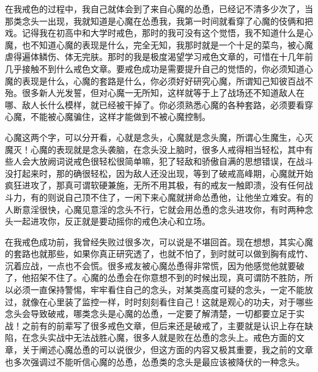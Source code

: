 在我戒色的过程中，我自己就体会到了来自心魔的怂恿，已经记不清多少次了，当那类念头一出现，我就知道是心魔在怂恿我，我第一时间就看穿了心魔的伎俩和把戏。记得我在初高中和大学时戒色，那时的我可没有这个觉悟，我不知道什么是心魔，也不知道心魔的表现是什么，完全无知，我那时就是一个十足的菜鸟，被心魔虐得遍体鳞伤、体无完肤。那时的我是极度渴望学习戒色文章的，可惜在十几年前几乎接触不到什么戒色文章。要戒色成功是需要提升自己的觉悟的，你必须知道心魔的表现是什么，心魔的套路是什么，你必须好好研究心魔，所谓知己知彼百战不殆。很多新人光发誓，但对心魔一无所知，这样就等于上了战场还不知道敌人在哪、敌人长什么模样，就已经被干掉了。你必须熟悉心魔的各种套路，必须要看穿心魔，不能被心魔骗住，这样才能做到不被心魔控制。

心魔这两个字，可以分开看，心就是念头，心魔就是念头魔，所谓心生魔生，心灭魔灭！心魔的表现就是念头袭脑，在念头没上脑时，很多人戒得相当轻松，其中有些人会大放阙词说戒色很轻松很简单嘛，犯了轻敌和骄傲自满的思想错误，在战斗没打起来时，那的确很轻松，因为敌人还没出现，等到了破戒高峰期，心魔就开始疯狂进攻了，那真可谓软硬兼施，无所不用其极，有的戒友一触即溃，没有任何战斗力，有的则说自己顶不住了，一闲下来心魔就拼命怂恿他，让他坐立难安。有的人断意淫很快，心魔见意淫的念头不行，它就会用怂恿的念头进攻你，有时两种念头一起进攻你，反正就是要动摇你的戒色决心和立场。

在我戒色成功前，我曾经失败过很多次，可以说是不堪回首。现在想想，其实心魔的套路也就那些，如果你真正研究透了，也就不怕了，到时就可以做到胸有成竹、沉着应战，一点也不会慌。很多戒友被心魔怂恿得非常慌，因为他感觉他就要破了，他招架不住了。心魔的怂恿会在你意想不到的时候出现，真可谓防不胜防，所以必须一直保持警惕，牢牢看住自己的念头，对某类高度可疑的念头，一定不能放过，就像在心里装了监控一样，时时刻刻看住自己！这就是观心的功夫，对于哪些念头会导致破戒，哪类念头是心魔的怂恿，一定要了解清楚，一切都要立足于实战！之前有的前辈写了很多戒色文章，但后来还是破戒了，主要就是认识上存在缺陷，在念头实战中无法战胜心魔，很多人就是败在怂恿的念头上。戒色方面的文章，关于阐述心魔怂恿的可以说很少，但这方面的内容又极其重要，我之前的文章也多次强调过不能听信心魔的怂恿，怂恿类的念头是最应该被降伏的一种念头。

